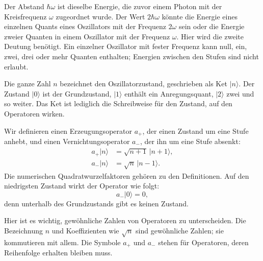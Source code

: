 Der Abstand \(\hbar\omega\) ist dieselbe Energie, die zuvor einem Photon mit der Kreisfrequenz \(\omega\) zugeordnet wurde. Der Wert \(2\hbar\omega\) könnte die Energie eines einzelnen Quants eines Oszillators mit der Frequenz \(2\omega\) sein oder die Energie zweier Quanten in einem Oszillator mit der Frequenz \(\omega\). Hier wird die zweite Deutung benötigt. Ein einzelner Oszillator mit fester Frequenz kann null, ein, zwei, drei oder mehr Quanten enthalten; Energien zwischen den Stufen sind nicht erlaubt.

Die ganze Zahl \(n\) bezeichnet den Oszillatorzustand, geschrieben als Ket \(|n\rangle\). Der Zustand \(|0\rangle\) ist der Grundzustand, \(|1\rangle\) enthält ein Anregungsquant, \(|2\rangle\) zwei und so weiter. Das Ket ist lediglich die Schreibweise für den Zustand, auf den Operatoren wirken.

Wir definieren einen Erzeugungsoperator \(a_+\), der einen Zustand um eine Stufe anhebt, und einen Vernichtungsoperator \(a_-\), der ihn um eine Stufe absenkt:
\begin{align}
a_+|n\rangle &= \sqrt{n+1}\,|n+1\rangle,\\
a_-|n\rangle &= \sqrt{n}\,|n-1\rangle.
\end{align}
Die numerischen Quadratwurzelfaktoren gehören zu den Definitionen. Auf den niedrigsten Zustand wirkt der Operator wie folgt:
\begin{equation}
a_-|0\rangle=0,
\end{equation}
denn unterhalb des Grundzustands gibt es keinen Zustand.

Hier ist es wichtig, gewöhnliche Zahlen von Operatoren zu unterscheiden. Die Bezeichnung \(n\) und Koeffizienten wie \(\sqrt n\) sind gewöhnliche Zahlen; sie kommutieren mit allem. Die Symbole \(a_+\) und \(a_-\) stehen für Operatoren, deren Reihenfolge erhalten bleiben muss.

